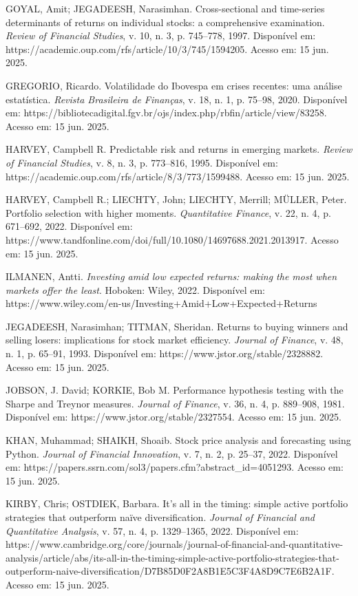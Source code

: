 \noindent
GOYAL, Amit; JEGADEESH, Narasimhan. Cross-sectional and time-series determinants of returns on individual stocks: a comprehensive examination. \textit{Review of Financial Studies}, v. 10, n. 3, p. 745--778, 1997. Disponível em: https://academic.oup.com/rfs/article/10/3/745/1594205. Acesso em: 15 jun. 2025.

\noindent
GREGORIO, Ricardo. Volatilidade do Ibovespa em crises recentes: uma análise estatística. \textit{Revista Brasileira de Finanças}, v. 18, n. 1, p. 75--98, 2020. Disponível em: https://bibliotecadigital.fgv.br/ojs/index.php/rbfin/article/view/83258. Acesso em: 15 jun. 2025.

\noindent
HARVEY, Campbell R. Predictable risk and returns in emerging markets. \textit{Review of Financial Studies}, v. 8, n. 3, p. 773--816, 1995. Disponível em: https://academic.oup.com/rfs/article/8/3/773/1599488. Acesso em: 15 jun. 2025.

\noindent
HARVEY, Campbell R.; LIECHTY, John; LIECHTY, Merrill; MÜLLER, Peter. Portfolio selection with higher moments. \textit{Quantitative Finance}, v. 22, n. 4, p. 671--692, 2022. Disponível em: https://www.tandfonline.com/doi/full/10.1080/14697688.2021.2013917. Acesso em: 15 jun. 2025.

\noindent
ILMANEN, Antti. \textit{Investing amid low expected returns: making the most when markets offer the least}. Hoboken: Wiley, 2022. Disponível em: https://www.wiley.com/en-us/Investing+Amid+Low+Expected+Returns%

\noindent
JEGADEESH, Narasimhan; TITMAN, Sheridan. Returns to buying winners and selling losers: implications for stock market efficiency. \textit{Journal of Finance}, v. 48, n. 1, p. 65--91, 1993. Disponível em: https://www.jstor.org/stable/2328882. Acesso em: 15 jun. 2025.

\noindent
JOBSON, J. David; KORKIE, Bob M. Performance hypothesis testing with the Sharpe and Treynor measures. \textit{Journal of Finance}, v. 36, n. 4, p. 889--908, 1981. Disponível em: https://www.jstor.org/stable/2327554. Acesso em: 15 jun. 2025.

\noindent
KHAN, Muhammad; SHAIKH, Shoaib. Stock price analysis and forecasting using Python. \textit{Journal of Financial Innovation}, v. 7, n. 2, p. 25--37, 2022. Disponível em: https://papers.ssrn.com/sol3/papers.cfm?abstract\_id=4051293. Acesso em: 15 jun. 2025.

\noindent
KIRBY, Chris; OSTDIEK, Barbara. It's all in the timing: simple active portfolio strategies that outperform naïve diversification. \textit{Journal of Financial and Quantitative Analysis}, v. 57, n. 4, p. 1329--1365, 2022. Disponível em: https://www.cambridge.org/core/journals/journal-of-financial-and-quantitative-analysis/article/abs/its-all-in-the-timing-simple-active-portfolio-strategies-that-outperform-naive-diversification/D7B85D0F2A8B1E5C3F4A8D9C7E6B2A1F. Acesso em: 15 jun. 2025.


